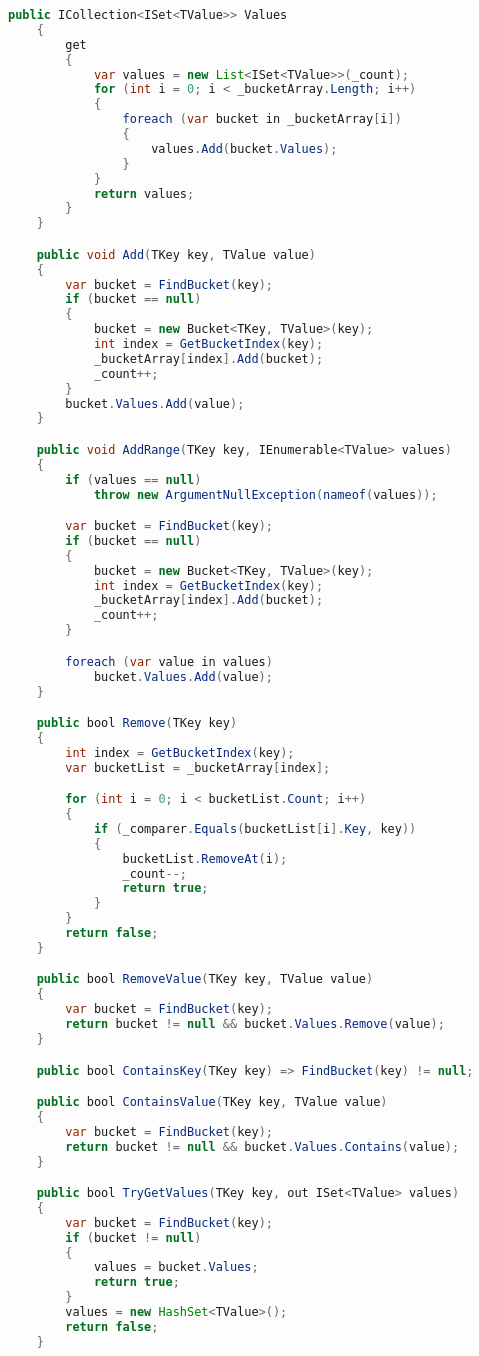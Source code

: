 \documentclass[12pt]{article}
\begin{document}
\begin{lstlisting}[language=Java]
    public ICollection<ISet<TValue>> Values
    {
        get
        {
            var values = new List<ISet<TValue>>(_count);
            for (int i = 0; i < _bucketArray.Length; i++)
            {
                foreach (var bucket in _bucketArray[i])
                {
                    values.Add(bucket.Values);
                }
            }
            return values;
        }
    }

    public void Add(TKey key, TValue value)
    {
        var bucket = FindBucket(key);
        if (bucket == null)
        {
            bucket = new Bucket<TKey, TValue>(key);
            int index = GetBucketIndex(key);
            _bucketArray[index].Add(bucket);
            _count++;
        }
        bucket.Values.Add(value);
    }

    public void AddRange(TKey key, IEnumerable<TValue> values)
    {
        if (values == null)
            throw new ArgumentNullException(nameof(values));

        var bucket = FindBucket(key);
        if (bucket == null)
        {
            bucket = new Bucket<TKey, TValue>(key);
            int index = GetBucketIndex(key);
            _bucketArray[index].Add(bucket);
            _count++;
        }

        foreach (var value in values)
            bucket.Values.Add(value);
    }

    public bool Remove(TKey key)
    {
        int index = GetBucketIndex(key);
        var bucketList = _bucketArray[index];

        for (int i = 0; i < bucketList.Count; i++)
        {
            if (_comparer.Equals(bucketList[i].Key, key))
            {
                bucketList.RemoveAt(i);
                _count--;
                return true;
            }
        }
        return false;
    }

    public bool RemoveValue(TKey key, TValue value)
    {
        var bucket = FindBucket(key);
        return bucket != null && bucket.Values.Remove(value);
    }

    public bool ContainsKey(TKey key) => FindBucket(key) != null;

    public bool ContainsValue(TKey key, TValue value)
    {
        var bucket = FindBucket(key);
        return bucket != null && bucket.Values.Contains(value);
    }

    public bool TryGetValues(TKey key, out ISet<TValue> values)
    {
        var bucket = FindBucket(key);
        if (bucket != null)
        {
            values = bucket.Values;
            return true;
        }
        values = new HashSet<TValue>();
        return false;
    }


\end{lstlisting}
\end{document}
